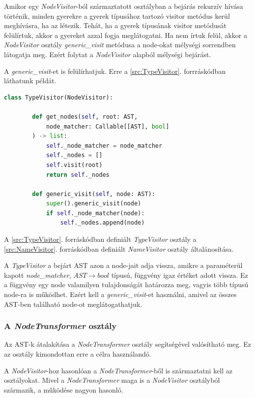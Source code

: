 Amikor egy \emph{NodeVisitor}-ból származtatott osztályban a bejárás rekurzív hívása történik,
minden gyerekre a gyerek típusához tartozó visitor metódus kerül meghívásra, ha az létezik.
Tehát, ha a gyerek típusának visitor metódusát felülírtuk, akkor a gyereket azzal fogja meglátogatni.
Ha nem írtuk felül, akkor a \emph{NodeVisitor} osztály
\emph{generic\_visit} metódusa a node-okat mélységi sorrendben látogatja meg.
Ezért folytat a \emph{NodeVisitor} alapból mélységi bejárást.

A \emph{generic\_visit}-et is felülírhatjuk.
Erre a \ref{src:TypeVisitor}. forrráskódban láthatunk példát.

\begin{lstlisting}[language={Python}]
	class TypeVisitor(NodeVisitor):
		
		def get_nodes(self, root: AST,
			node_matcher: Callable[[AST], bool]
		) -> list:
			self._node_matcher = node_matcher
			self._nodes = []
			self.visit(root)
			return self._nodes
		
		def generic_visit(self, node: AST):
			super().generic_visit(node)
			if self._node_matcher(node):
				self._nodes.append(node)
\end{lstlisting}

A \ref{src:TypeVisitor}. forráskódban definiált \emph{TypeVisitor} osztály
a \ref{src:NameVisitor}. forráskódban definiált \emph{NameVisitor} osztály
általánosítása.

A \emph{TypeVisitor} a bejárt AST azon a node-jait adja vissza,
amikre a paraméterül kapott \emph{node\_matcher}, $AST \rightarrow bool$ típusú,
függvény igaz értéket adott vissza.
Ez a függvény egy node valamilyen tulajdonságát határozza meg,
vagyis több típusú node-ra is működhet.
Ezért kell a \emph{generic\_visit}-et használni,
amivel az összes AST-ben található node-ot meglátogathatjuk.

\subsubsection{A \emph{NodeTransformer} osztály}

Az AST-k átalakítása a \emph{NodeTransformer} osztály segítségével valósítható meg.
Ez az osztály kimondottan erre a célra használandó.

A \emph{NodeVisitor}-hoz hasonlóan a \emph{NodeTransformer}-ből is származtatni
kell az osztályokat.
Mivel a \emph{NodeTransformer} maga is a \emph{NodeVisitor} osztályból származik,
a működése nagyon hasonló.

